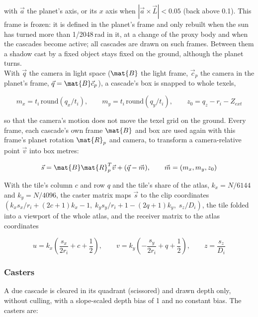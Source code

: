 \documentclass[Orbiter Technical Reference.tex]{subfiles}
\begin{document}
\begin{sloppypar}
\noindent
with $\vec{a}$ the planet's axis, or its $x$ axis when $|\vec{a} \times \vec{L}| < 0.05$ (back above 0.1). This frame is frozen: it is defined in the planet's frame and only rebuilt when the sun has turned more than 1/2048\,rad in it, at a change of the proxy body and when the cascades become active; all cascades are drawn on such frames. Between them a shadow cast by a fixed object stays fixed on the ground, although the planet turns.\\
With $\vec{q}$ the camera in light space ($\mat{B}$ the light frame, $\vec{c}_{p}$ the camera in the planet's frame, $\vec{q} = \mat{B}\vec{c}_{p}$), a cascade's box is snapped to whole texels,

\[ m_{x} = t_{i}\,\mathrm{round}(q_{x}/t_{i}), \qquad m_{y} = t_{i}\,\mathrm{round}(q_{y}/t_{i}), \qquad z_{0} = q_{z} - r_{i} - Z_{ext} \]

\noindent
so that the camera's motion does not move the texel grid on the ground. Every frame, each cascade's own frame $\mat{B}$ and box are used again with this frame's planet rotation $\mat{R}_{p}$ and camera, to transform a camera-relative point $\vec{v}$ into box metres:

\[ \vec{s} = \mat{B}\mat{R}_{p}^{T}\vec{v} + (\vec{q} - \vec{m}), \qquad \vec{m} = (m_{x}, m_{y}, z_{0}) \]

\noindent
With the tile's column $c$ and row $q$ and the tile's share of the atlas, $k_{x} = N/6144$ and $k_{y} = N/4096$, the caster matrix maps $\vec{s}$ to the clip coordinates $(k_{x}s_{x}/r_{i} + (2c + 1)k_{x} - 1,\; k_{y}s_{y}/r_{i} + 1 - (2q + 1)k_{y},\; s_{z}/D_{i})$, the tile folded into a viewport of the whole atlas, and the receiver matrix to the atlas coordinates

\[ u = k_{x}\left(\frac{s_{x}}{2r_{i}} + c + \frac{1}{2}\right), \qquad v = k_{y}\left(-\frac{s_{y}}{2r_{i}} + q + \frac{1}{2}\right), \qquad z = \frac{s_{z}}{D_{i}} \]

\subsubsection{Casters}
A due cascade is cleared in its quadrant (scissored) and drawn depth only, without culling, with a slope-scaled depth bias of 1 and no constant bias. The casters are:


\end{sloppypar}
\end{document}
